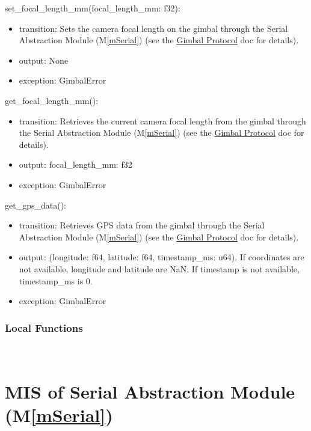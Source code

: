 \documentclass[12pt, titlepage]{article}
\newcommand{\mref}[1]{M\ref{#1}}
\begin{document}
\noindent set\_focal\_length\_mm(focal\_length\_mm: f32):
\begin{itemize}
  \item transition: Sets the camera focal length on the gimbal through the Serial
        Abstraction Module (\mref{mSerial}) (see the
        \href{https://github.com/SpaceY-Labs/RoCam/blob/main/docs/Design/GimbalProtocol/GimbalProtocol.pdf}{Gimbal
          Protocol} doc for details).
  \item output: None
  \item exception: GimbalError
\end{itemize}

\noindent get\_focal\_length\_mm():
\begin{itemize}
  \item transition: Retrieves the current camera focal length from the gimbal through
        the Serial Abstraction Module (\mref{mSerial}) (see the
        \href{https://github.com/SpaceY-Labs/RoCam/blob/main/docs/Design/GimbalProtocol/GimbalProtocol.pdf}{Gimbal
          Protocol} doc for details).
  \item output: focal\_length\_mm: f32
  \item exception: GimbalError
\end{itemize}

\noindent get\_gps\_data():
\begin{itemize}
  \item transition: Retrieves GPS data from the gimbal through the Serial Abstraction
        Module (\mref{mSerial}) (see the
        \href{https://github.com/SpaceY-Labs/RoCam/blob/main/docs/Design/GimbalProtocol/GimbalProtocol.pdf}{Gimbal
          Protocol} doc for details).
  \item output: (longitude: f64, latitude: f64, timestamp\_ms: u64). If coordinates are
        not available, longitude and latitude are NaN. If timestamp is not available,
        timestamp\_ms is 0.
  \item exception: GimbalError
\end{itemize}

\subsubsection{Local Functions}

\ \

\section{MIS of Serial Abstraction Module (\mref{mSerial})}
\end{document}
